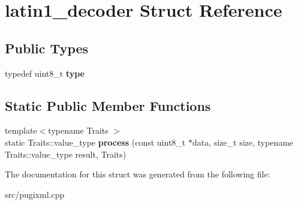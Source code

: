 \hypertarget{structlatin1__decoder}{}\section{latin1\+\_\+decoder Struct Reference}
\label{structlatin1__decoder}
\subsection*{Public Types}
\begin{DoxyCompactItemize}
\item 
\mbox{\label{structlatin1__decoder_a8eec1209fbcf34e5a8fe7bfc082f9c1b}} 
typedef uint8\+\_\+t {\bfseries type}
\end{DoxyCompactItemize}
\subsection*{Static Public Member Functions}
\begin{DoxyCompactItemize}
\item 
\mbox{\label{structlatin1__decoder_acf3e6f85693d539919dec3bfb9cee66f}} 
{\footnotesize template$<$typename Traits $>$ }\\static Traits\+::value\+\_\+type {\bfseries process} (const uint8\+\_\+t $\ast$data, size\+\_\+t size, typename Traits\+::value\+\_\+type result, Traits)
\end{DoxyCompactItemize}


The documentation for this struct was generated from the following file\+:\begin{DoxyCompactItemize}
\item 
src/pugixml.\+cpp\end{DoxyCompactItemize}
